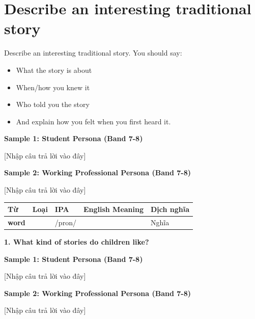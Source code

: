 \section{Describe an interesting traditional story}
\begin{ieltsprompt}
Describe an interesting traditional story.
You should say:
\begin{itemize}[leftmargin=2em, itemsep=2pt]
\item What the story is about
\item When/how you knew it
\item Who told you the story
\item And explain how you felt when you first heard it.
\end{itemize}
\end{ieltsprompt}
\begin{ieltsanswer}
\textbf{Sample 1: Student Persona (Band 7-8)}

[Nhập câu trả lời vào đây]

\textbf{Sample 2: Working Professional Persona (Band 7-8)}

[Nhập câu trả lời vào đây]
\end{ieltsanswer}


\vspace{0.8em}
\begin{center}
\renewcommand{\arraystretch}{1.65}
\begin{tabularx}{\textwidth}{|V{0.22\textwidth}|C{0.07\textwidth}|I{0.20\textwidth}|Y|V{0.18\textwidth}|}
\hline
{}
\textbf{Từ} & \textbf{Loại} & \textbf{IPA} & \textbf{English Meaning} & \textbf{Dịch nghĩa} \\
\hline
\textbf{word} & & /pron/ & & Nghĩa \\ \hline
\end{tabularx}
\end{center}

\partthreeheader

\begin{ieltsquestion}
\textbf{1. What kind of stories do children like?}
\end{ieltsquestion}
\textbf{Sample 1: Student Persona (Band 7-8)}

[Nhập câu trả lời vào đây]

\textbf{Sample 2: Working Professional Persona (Band 7-8)}

[Nhập câu trả lời vào đây]

\separator

